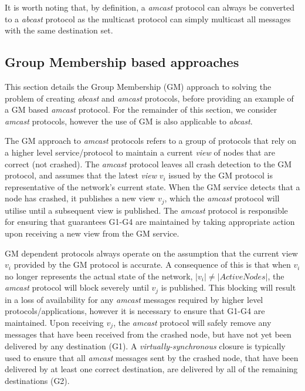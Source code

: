        It is worth noting that, by definition, a \emph{amcast} protocol can always be converted to a \emph{abcast} protocol as the multicast protocol can simply multicast all messages with the same destination set.  
       
	\subsection{Group Membership based approaches}
    This section details the Group Membership (GM) approach to solving the problem of creating \emph{abcast} and \emph{amcast} protocols, before providing an example of a GM based \emph{amcast} protocol.  For the remainder of this section, we consider \emph{amcast} protocols, however the use of GM is also applicable to \emph{abcast}.  
	
	The GM approach to \emph{amcast} protocols refers to a group of protocols that rely on a higher level service/protocol to maintain a current \emph{view} of nodes that are correct (not crashed).  The \emph{amcast} protocol leaves all crash detection to the GM protocol, and assumes that the latest \emph{view} $v_i$ issued by the GM protocol is representative of the network's current state.  When the GM service detects that a node has crashed, it publishes a new view $v_j$, which the \emph{amcast} protocol will utilise until a subsequent view is published.  The \emph{amcast} protocol is responsible for ensuring that guarantees G1-G4 are maintained by taking appropriate action upon receiving a new view from the GM service.  
	
	GM dependent protocols always operate on the assumption that the current view $v_i$ provided by the GM protocol is accurate.  A consequence of this is that when $v_i$ no longer represents the actual state of the network, $\left\vert v_i \right\vert \neq \left\vert ActiveNodes \right\vert$, the \emph{amcast} protocol will block severely until $v_j$ is published.  This blocking will result in a loss of availability for any \emph{amcast} messages required by higher level protocols/applications, however it is necessary to ensure that G1-G4 are maintained.  Upon receiving $v_j$, the \emph{amcast} protocol will safely remove any messages that have been received from the crashed node, but have not yet been delivered by any destination (G1).  A \emph{virtually-synchronous}\cite{Birman:1991:LCA:128738.128742} closure is typically used to ensure that all \emph{amcast} messages sent by the crashed node, that have been delivered by at least one correct destination, are delivered by all of the remaining destinations (G2).  

